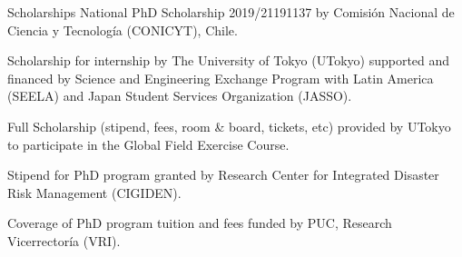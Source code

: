 \begin{rubric}{Scholarships}
\entry*[2019]%
	National PhD Scholarship 2019/21191137 by Comisi\'on Nacional de Ciencia y Tecnolog\'ia (CONICYT), Chile.

\entry*[2018]%
	Scholarship for internship by The University of Tokyo (UTokyo) supported and financed by Science and Engineering Exchange Program with Latin America (SEELA) and Japan Student Services Organization (JASSO).

\entry*[2017]%
	Full Scholarship (stipend, fees, room \& board, tickets, etc) provided by UTokyo to participate in the Global Field Exercise Course.

\entry*[2016 - 2018]%
	Stipend for PhD program granted by  Research Center for Integrated Disaster Risk Management (CIGIDEN).
	 
\entry*[2015 - 2017]%
	Coverage of PhD program tuition and fees funded by PUC, Research Vicerrector\'ia (VRI).
\end{rubric}
    
